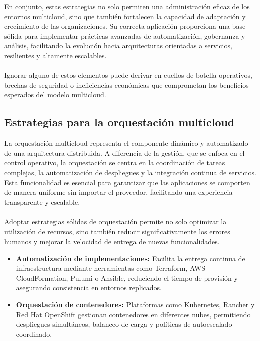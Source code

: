 {            En conjunto, estas estrategias no solo permiten una administración eficaz de los entornos multicloud, sino que también fortalecen la capacidad de adaptación y crecimiento de las organizaciones. Su correcta aplicación proporciona una base sólida para implementar prácticas avanzadas de automatización, gobernanza y análisis, facilitando la evolución hacia arquitecturas orientadas a servicios, resilientes y altamente escalables.
            
            \paragraph{}Ignorar alguno de estos elementos puede derivar en cuellos de botella operativos, brechas de seguridad o ineficiencias económicas que comprometan los beneficios esperados del modelo multicloud.

        \subsection{Estrategias para la orquestación multicloud}
            La orquestación multicloud representa el componente dinámico y automatizado de una arquitectura distribuida. A diferencia de la gestión, que se enfoca en el control operativo, la orquestación se centra en la coordinación de tareas complejas, la automatización de despliegues y la integración continua de servicios. Esta funcionalidad es esencial para garantizar que las aplicaciones se comporten de manera uniforme sin importar el proveedor, facilitando una experiencia transparente y escalable.
            
            \paragraph{}Adoptar estrategias sólidas de orquestación permite no solo optimizar la utilización de recursos, sino también reducir significativamente los errores humanos y mejorar la velocidad de entrega de nuevas funcionalidades.

            \begin{itemize}
                \item \textbf{Automatización de implementaciones:} Facilita la entrega continua de infraestructura mediante herramientas como Terraform, AWS CloudFormation, Pulumi o Ansible, reduciendo el tiempo de provisión y asegurando consistencia en entornos replicados.
                
                \item \textbf{Orquestación de contenedores:} Plataformas como Kubernetes, Rancher y Red Hat OpenShift gestionan contenedores en diferentes nubes, permitiendo despliegues simultáneos, balanceo de carga y políticas de autoescalado coordinado.
                

\end{itemize}}
